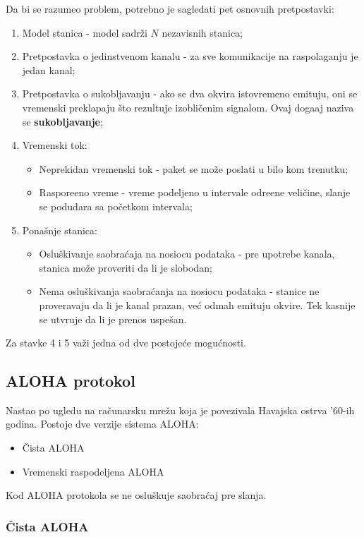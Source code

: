 \documentclass{article} %
\begin{document}
Da bi se razumeo problem, potrebno je sagledati pet osnovnih pretpostavki:
\begin{enumerate}
	\item Model stanica - model sadr\v{z}i $N$ nezavisnih stanica;
	\item Pretpostavka o jedinstvenom kanalu - za sve komunikacije na raspolaganju je jedan kanal;
	\item Pretpostavka o sukobljavanju - ako se dva okvira istovremeno emituju, oni se vremenski preklapaju \v{s}to rezultuje izobli\v{c}enim signalom. Ovaj doga\dj{}aj naziva se \textbf{sukobljavanje};
	\item Vremenski tok:
	\begin{itemize}
		\item Neprekidan vremenski tok - paket se mo\v{z}e poslati u bilo kom trenutku;
		\item Raspore\dj{}eno vreme - vreme podeljeno u intervale odre\dj{}ene veli\v{c}ine, slanje se podudara sa po\v{c}etkom intervala;
	\end{itemize}
	\item Pona\v{s}nje stanica:
	\begin{itemize}
		\item Oslu\v{s}kivanje saobra\'{c}aja na nosiocu podataka - pre upotrebe kanala, stanica mo\v{z}e proveriti da li je slobodan;
		\item Nema oslu\v{s}kivanja saobra\'{c}anja na nosiocu podataka - stanice ne proveravaju da li je kanal prazan, ve\'{c} odmah emituju okvire. Tek kasnije se utvr\dj{}uje da li je prenos uspe\v{s}an.
	\end{itemize}
\end{enumerate}
Za stavke 4 i 5 va\v{z}i jedna od dve postoje\'{c}e mogu\'{c}nosti.

\subsection{ALOHA protokol}

Nastao po ugledu na ra\v{c}unarsku mre\v{z}u koja je povezivala Havajska ostrva '60-ih godina. Postoje dve verzije sistema ALOHA:
\begin{itemize}
	\item \v{C}ista ALOHA
	\item Vremenski raspodeljena ALOHA
\end{itemize}
Kod ALOHA protokola se ne oslu\v{s}kuje saobra\'{c}aj pre slanja.

\subsubsection{\v{C}ista ALOHA}
\end{document}
